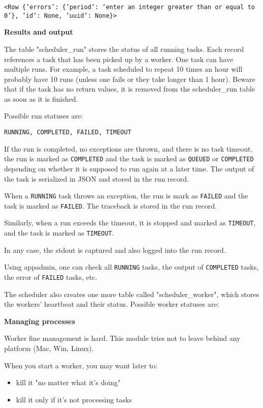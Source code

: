\documentclass[justified,sixbynine,notoc]{tufte-book}
\def\ft{\small\tt}
\begin{document}
\begin{fullwidth}
{\ft <Row \{'errors': \{'period': 'enter an integer greater than or equal to 0'\}, 'id': None, 'uuid': None\}>}

{\bf Results and output}

The table "scheduler\_run" stores the status of all running tasks. Each record references a task that has been picked up by a worker.  One task can have multiple runs. For example, a task scheduled to repeat 10 times an hour will probably have 10 runs (unless one fails or they take longer than 1 hour). Beware that if the task has no return values, it is removed from the scheduler\_run table as soon as it is finished.

Possible run statuses are:

\begin{lstlisting}
RUNNING, COMPLETED, FAILED, TIMEOUT
\end{lstlisting}

If the run is completed, no exceptions are thrown, and there is no task timeout, the run is marked as {\ft COMPLETED} and the task is marked as {\ft QUEUED} or {\ft COMPLETED} depending on whether it is supposed to run again at a later time. The output of the task is serialized in JSON and stored in the run record.

When a {\ft RUNNING} task throws an exception, the run is mark as {\ft FAILED} and the task is marked as {\ft FAILED}. The traceback is stored in the run record.

Similarly, when a run exceeds the timeout, it is stopped and marked as {\ft TIMEOUT}, and the task is marked as {\ft TIMEOUT}.

In any case, the stdout is captured and also logged into the run record.

Using appadmin, one can check all {\ft RUNNING} tasks, the output of {\ft COMPLETED} tasks, the error of {\ft FAILED} tasks, etc.

The scheduler also creates one more table called "scheduler\_worker", which stores the workers' heartbeat and their status. Possible worker statuses are:

{\bf Managing processes}

Worker fine management is hard. This module tries not to leave behind any platform (Mac, Win, Linux).

When you start a worker, you may want later to:
\begin{itemize}
\item kill it "no matter what it's doing"

\item kill it only if it's not processing tasks


\end{itemize}
\end{fullwidth}
\end{document}
